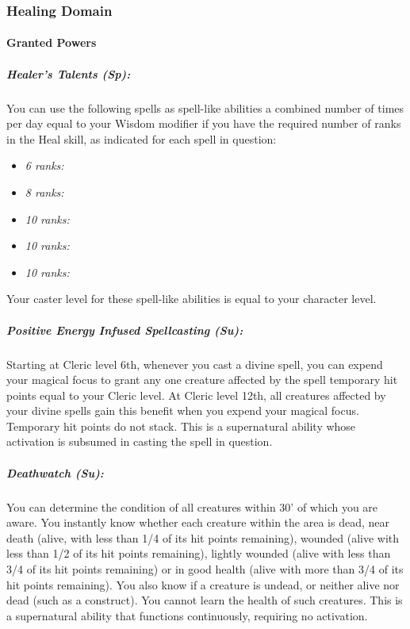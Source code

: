 \subsubsection{Healing Domain}
\paragraph{Granted Powers}
\subparagraph{Healer's Talents (Sp):}
You can use the following spells as spell-like abilities a combined number of times per day equal to your Wisdom modifier if you have the required number of ranks in the Heal skill, as indicated for each spell in question:
\begin{itemize}
 \item \emph{6 ranks:} 
 \item \emph{8 ranks:} 
 \item \emph{10 ranks:} 
 \item \emph{10 ranks:} 
 \item \emph{10 ranks:} 
\end{itemize}
Your caster level for these spell-like abilities is equal to your character level.
\subparagraph{Positive Energy Infused Spellcasting (Su):}
Starting at Cleric level 6th, whenever you cast a divine spell, you can expend your magical focus to grant any one creature affected by the spell temporary hit points equal to your Cleric level. 
At Cleric level 12th, all creatures affected by your divine spells gain this benefit when you expend your magical focus.
Temporary hit points do not stack.
This is a supernatural ability whose activation is subsumed in casting the spell in question.
\subparagraph{Deathwatch (Su):}
You can determine the condition of all creatures within 30' of which you are aware. You instantly know whether each creature within the area is dead, near death (alive, with less than 1/4 of its hit points remaining), wounded (alive with less than 1/2 of its hit points remaining), lightly wounded (alive with less than 3/4 of its hit points remaining) or in good health (alive with more than 3/4 of its hit points remaining).
You also know if a creature is undead, or neither alive nor dead (such as a construct). You cannot learn the health of such creatures.
This is a supernatural ability that functions continuously, requiring no activation.
